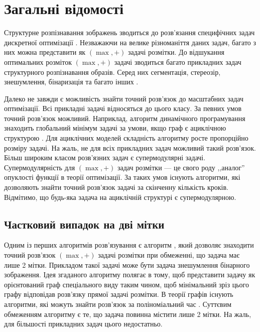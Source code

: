 \section{Загальні відомості}

Структурне розпізнавання зображень зводиться до розв'язання специфічних
задач дискретної оптимізації \cite{SchlGig_1_usim2007, Boykov, Boykov_2, savchynskyy}. Незважаючи на велике різноманіття даних задач,
багато з них можна представити як \((\max,+)\) задачі розмітки.
До відшукання оптимальних розміток \((\max,+)\) задачі зводиться багато
прикладних задач структурного розпізнавання образів. Серед них сегментація,
стереозір, знешумлення, бінаризація та багато інших \cite{WANG20131610, Boykov_2, comp_vision}.

Далеко не завжди є можливість знайти точний розв'язок до
масштабних задач оптимізації. Всі прикладні задачі відносяться до цього класу.
За певних умов точний розв'язок можливий. Наприклад, алгоритм динамічного програмування
знаходить глобальний мінімум задачі за умови, якщо граф є ациклічною
структурою \cite{ten_lectures}. Для ациклічних моделей складність алгоритму росте пропорційно
розміру задачі.
На жаль, не для всіх прикладних задач можливий такий розв'язок.
Більш широким класом розв'язних задач є супермодулярні задачі. Супермодулярність
для \((\max,+)\) задач розмітки --- це свого роду ,,аналог'' опуклості функції в теорії
оптимізації. За таких умов існують алгоритми, які дозволяють знайти
точний розв'язок задачі за скінченну кількість кроків.
Відмітимо, що будь-яка задача на ациклічній структурі є супермодулярною.

\subsection{Частковий випадок на дві мітки}
Одним із перших алгоритмів розв'язування є алгоритм \cite{Greig_port}, який
дозволяє знаходити точний розв'язок \((\max,+)\) задачі розмітки при обмеженні, що
задача має лише 2 мітки. Прикладом такої задачі може бути задача знешумлення
бінарного зображення.
Ідея згаданого алгоритму полягає в тому, щоб
представити задачу як орієнтований граф спеціального виду таким чином, щоб
мінімальний зріз цього графу відповідав розв'язку прямої задачі розмітки.
В теорії графів існують алгоритми, які можуть знайти розв'язок за поліноміальний
час \cite{Boykov, Boykov_2, ford}. Суттєвим обмеженням алгоритму є те, що задача повинна містити лише 2 мітки.
На жаль, для більшості прикладних задач цього недостатньо.


